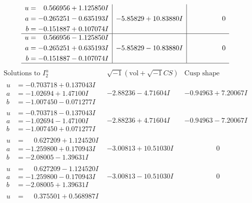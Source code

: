 \documentclass[1p]{elsarticle_modified}
\theoremstyle{definition}
\newcommand{\I}{\sqrt{-1}}
\begin{document}
$$\begin{array}{c|c|c}
\begin{aligned}
u &= \phantom{-}0.566956 + 1.125850 I \\
a &= -0.265251 - 0.635193 I \\
b &= -0.151887 + 0.107074 I\end{aligned}
 & -5.85829 + 10.83880 I & \phantom{-0.000000 } 0 \\ \hline\begin{aligned}
u &= \phantom{-}0.566956 - 1.125850 I \\
a &= -0.265251 + 0.635193 I \\
b &= -0.151887 - 0.107074 I\end{aligned}
 & -5.85829 - 10.83880 I & \phantom{-0.000000 } 0\\
 \hline 
 \end{array}$$\newpage$$\begin{array}{c|c|c}  
\text{Solutions to }I^u_{2}& \I (\text{vol} + \sqrt{-1}CS) & \text{Cusp shape}\\
 \hline 
\begin{aligned}
u &= -0.703718 + 0.137043 I \\
a &= -1.02694 + 1.47100 I \\
b &= -1.007450 - 0.071277 I\end{aligned}
 & -2.88236 - 4.71604 I & -0.94963 + 7.20067 I \\ \hline\begin{aligned}
u &= -0.703718 - 0.137043 I \\
a &= -1.02694 - 1.47100 I \\
b &= -1.007450 + 0.071277 I\end{aligned}
 & -2.88236 + 4.71604 I & -0.94963 - 7.20067 I \\ \hline\begin{aligned}
u &= \phantom{-}0.627209 + 1.124520 I \\
a &= -1.259800 + 0.170943 I \\
b &= -2.08005 - 1.39631 I\end{aligned}
 & -3.00813 + 10.51030 I & \phantom{-0.000000 } 0 \\ \hline\begin{aligned}
u &= \phantom{-}0.627209 - 1.124520 I \\
a &= -1.259800 - 0.170943 I \\
b &= -2.08005 + 1.39631 I\end{aligned}
 & -3.00813 - 10.51030 I & \phantom{-0.000000 } 0 \\ \hline\begin{aligned}
u &= \phantom{-}0.375501 + 0.568987 I \\

\end{aligned}
\end{array}$$
\end{document}
